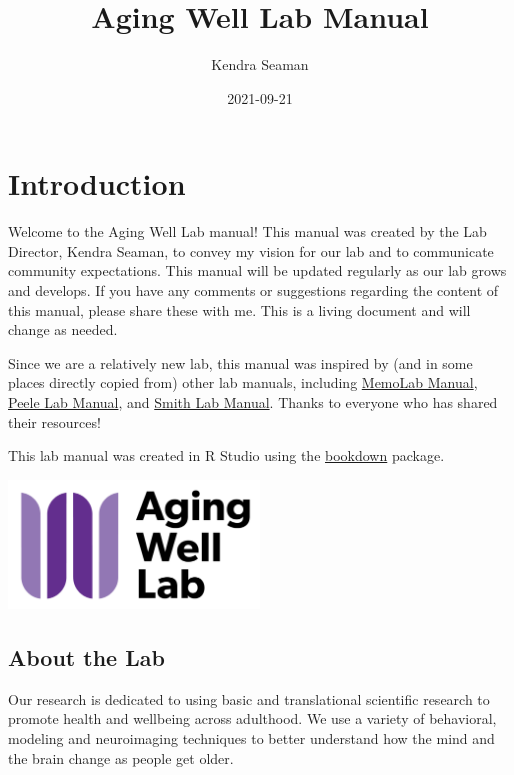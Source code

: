 \documentclass[]{book}
\title{Aging Well Lab Manual}
\author{Kendra Seaman}
\date{2021-09-21}
\begin{document}
\maketitle

{
\setcounter{tocdepth}{1}
\tableofcontents
}
\hypertarget{introduction}{%
\chapter{Introduction}\label{introduction}}

Welcome to the Aging Well Lab manual! This manual was created by the Lab Director, Kendra Seaman, to convey my vision for our lab and to communicate community expectations. This manual will be updated regularly as our lab grows and develops. If you have any comments or suggestions regarding the content of this manual, please share these with me. This is a living document and will change as needed.

Since we are a relatively new lab, this manual was inspired by (and in some places directly copied from) other lab manuals, including \href{https://github.com/memobc/memolab-manual}{MemoLab Manual}, \href{http://jpeelle.net/peellelab_manual.pdf}{Peele Lab Manual}, and \href{https://github.com/DVSneuro/smithlab_manual/blob/master/SmithLab_manual.pdf}{Smith Lab Manual}. Thanks to everyone who has shared their resources!

This lab manual was created in R Studio using the \href{https://bookdown.org/yihui/bookdown/}{bookdown} package.

\includegraphics[width=0.5\textwidth,height=\textheight]{images/awl.png}

\hypertarget{about-the-lab}{%
\section{About the Lab}\label{about-the-lab}}

Our research is dedicated to using basic and translational scientific research to promote health and wellbeing across adulthood. We use a variety of behavioral, modeling and neuroimaging techniques to better understand how the mind and the brain change as people get older.
\end{document}
